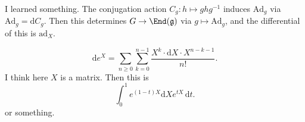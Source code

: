 
I learned something. The conjugation action $C_g : h\mapsto ghg^{-1} $ induces $\mathrm{Ad} _g$ via $\mathrm{Ad} _g=\mathrm{d} C_g$. Then this determines $G\to \End(\mathfrak{g} )$ via $g\mapsto \mathrm{Ad}_g$, and the differential of this is $\mathrm{ad}_X$.

\[
	\mathrm{d} e^X = \sum_{n\geq 0} \sum_{k=0}^{n-1} \frac{X^k\cdot \mathrm{d} X\cdot  X^{n-k-1} }{n!} 
.\]
I think here $X$ is a matrix. Then this is
\[
	\int_0^1 e^{(1-t)X} \mathrm{d} Xe^{tX}  \,\mathrm{d} t
.\]
or something.
